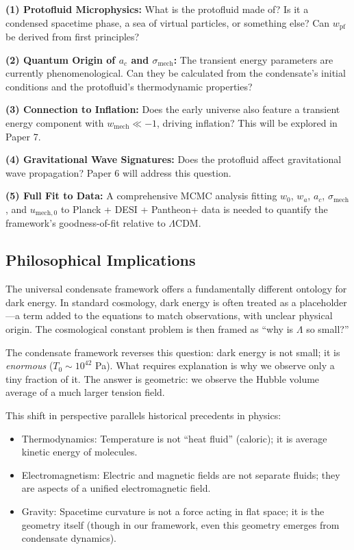 \documentclass[11pt,a4paper]{article}
\newcommand{\Tzero}{\ensuremath{T_0}}
\newcommand{\wmech}{\ensuremath{w_{\mathrm{mech}}}}
\newcommand{\wpf}{\ensuremath{w_{\mathrm{pf}}}}
\theoremstyle{definition}
\theoremstyle{remark}
\begin{document}
\textbf{(1) Protofluid Microphysics:} What is the protofluid made of? Is it a condensed spacetime phase, a sea of virtual particles, or something else? Can $\wpf$ be derived from first principles?

\textbf{(2) Quantum Origin of $a_c$ and $\sigma_{\mathrm{mech}}$:} The transient energy parameters are currently phenomenological. Can they be calculated from the condensate's initial conditions and the protofluid's thermodynamic properties?

\textbf{(3) Connection to Inflation:} Does the early universe also feature a transient energy component with $\wmech \ll -1$, driving inflation? This will be explored in Paper 7.

\textbf{(4) Gravitational Wave Signatures:} Does the protofluid affect gravitational wave propagation? Paper 6 will address this question.

\textbf{(5) Full Fit to Data:} A comprehensive MCMC analysis fitting $w_0$, $w_a$, $a_c$, $\sigma_{\mathrm{mech}}$, and $u_{\mathrm{mech},0}$ to Planck + DESI + Pantheon+ data is needed to quantify the framework's goodness-of-fit relative to $\Lambda$CDM.

\subsection{Philosophical Implications}
\label{sec:philosophy}

The universal condensate framework offers a fundamentally different ontology for dark energy. In standard cosmology, dark energy is often treated as a placeholder---a term added to the equations to match observations, with unclear physical origin. The cosmological constant problem is then framed as ``why is $\Lambda$ so small?''

The condensate framework reverses this question: dark energy is not small; it is \emph{enormous} ($\Tzero \sim 10^{42}$ Pa). What requires explanation is why we observe only a tiny fraction of it. The answer is geometric: we observe the Hubble volume average of a much larger tension field.

This shift in perspective parallels historical precedents in physics:
\begin{itemize}[leftmargin=*, itemsep=0.2em]
\item Thermodynamics: Temperature is not ``heat fluid'' (caloric); it is average kinetic energy of molecules.
\item Electromagnetism: Electric and magnetic fields are not separate fluids; they are aspects of a unified electromagnetic field.
\item Gravity: Spacetime curvature is not a force acting in flat space; it is the geometry itself (though in our framework, even this geometry emerges from condensate dynamics).
\end{itemize}
\end{document}
